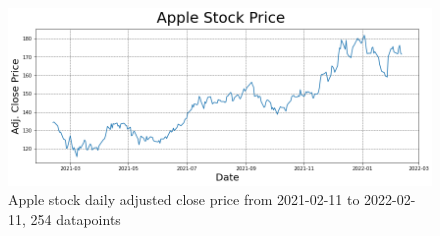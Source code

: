\documentclass[conference]{IEEEtran}
\begin{document}

\begin{figure}
\begin{center}
\includegraphics[scale=0.42]{AAPL_time_series.png}
\caption{Apple stock daily adjusted close price from 2021-02-11 to 2022-02-11, 254 datapoints}
\label{fig:AAPL_time_series}
\end{center}
\end{figure}
\end{document}
